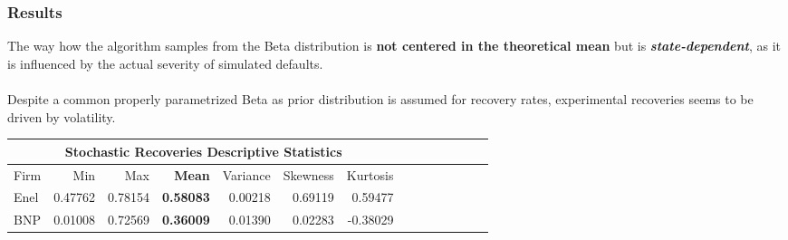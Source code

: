 \documentclass{beamer}
\begin{document}
\begin{frame}
\frametitle{Results}
	The way how the algorithm samples from the Beta distribution is \textbf{not centered in the theoretical mean} but is \textbf{\emph{state-dependent}}, as it is influenced by the actual severity of simulated defaults.\\~\\
	
	Despite a common properly parametrized Beta as prior distribution is assumed for recovery rates, experimental recoveries seems to be driven by volatility.

	\begin{table} [htbp]
	\centering
	\begin{tabular}{ |p{1.2 cm}| r|r|r|r|r|r|p{1.5cm}|r| p{1.5cm}| p{1.5cm}| 
			p{1.5cm}| p{1.5cm}| p{2 cm} |} 
		\hline
		\multicolumn{7}{|c|}{\textbf{Stochastic Recoveries Descriptive Statistics }} \\
		\hline
		Firm & Min & Max  &\textbf{Mean}& Variance & Skewness &Kurtosis\\
		\hline
		Enel &0.47762 & 0.78154  &\textbf{0.58083}  &0.00218 &0.69119 &0.59477\\
		
		
		BNP  &0.01008 & 0.72569  &\textbf{0.36009} &0.01390 &0.02283 &-0.38029 \\
		
		\hline
	\end{tabular}
		
	\end{table}
	
 
	
\end{frame}

 
\end{document}

